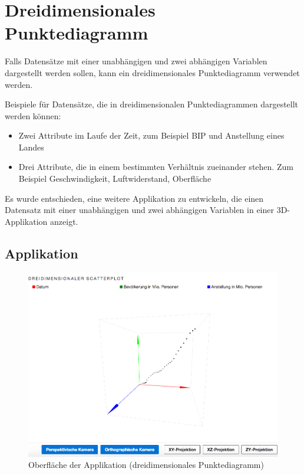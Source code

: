 \newpage
\section{Dreidimensionales Punktediagramm}

Falls Datensätze mit einer unabhängigen und zwei abhängigen Variablen dargestellt werden sollen, kann ein dreidimensionales Punktediagramm verwendet werden.

Beispiele für Datensätze, die in dreidimensionalen Punktediagrammen dargestellt werden können:

\begin{itemize}
	\item Zwei Attribute im Laufe der Zeit, zum Beispiel BIP und Anstellung eines Landes
	\item Drei Attribute, die in einem bestimmten Verhältnis zueinander stehen. Zum Beispiel Geschwindigkeit, Luftwiderstand, Oberfläche
\end{itemize}

Es wurde entschieden, eine weitere Applikation zu entwickeln, die einen Datensatz mit einer unabhängigen und zwei abhängigen Variablen in einer 3D-Applikation anzeigt.

\subsection{Applikation}

\begin{figure}[!htbp]
	\centering
	\includegraphics[width=\linewidth]{images/3d}
	\caption{Oberfläche der Applikation (dreidimensionales Punktediagramm)}
	\label{fig:3d}
\end{figure}

